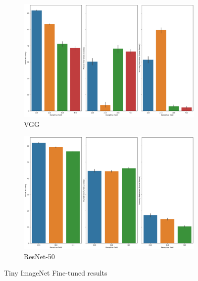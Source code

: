 \begin{figure}[!htb]
 \centering
     \begin{subfigure}[b]{\columnwidth}
    \includegraphics[width=1.1\columnwidth]{images/Supplementary_material/tiny_imagenet_vgg19_pruning_finetuned_results_0.9.png}
    \caption{VGG}
    \label{subfig:vgg19_tiny_imagenet_FInetuned}
     \end{subfigure}
      \hfill
     \begin{subfigure}[b]{\columnwidth}
    \includegraphics[width=1.1\columnwidth]{images/Supplementary_material/tiny_imagenet_resnet50_pruning_finetuned_results_0.9.png}
    \caption{ResNet-50}
    \label{subfig:resenet50tiny_imagenetFinetuned}
     \end{subfigure}
     \caption{Tiny ImageNet Fine-tuned results}
    \label{fig:finetuned_tiny_imagenet}
\end{figure}

